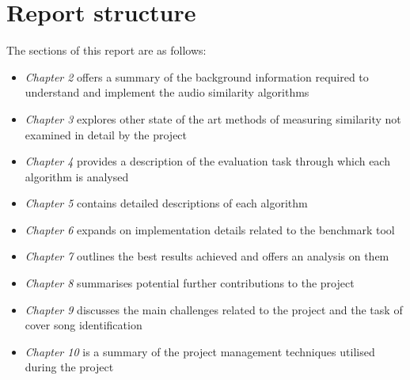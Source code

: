 \section{Report structure}
\label{structure}
The sections of this report are as follows:
\begin{itemize}
    \item \textit{Chapter 2} offers a summary of the background information required to
    understand and implement the audio similarity algorithms
    \item \textit{Chapter 3} explores other state of the art methods of measuring
    similarity not examined in detail by the project
    \item \textit{Chapter 4} provides a description of the evaluation task through which
    each algorithm is analysed
    \item \textit{Chapter 5} contains detailed descriptions of each algorithm
    \item \textit{Chapter 6} expands on implementation details related to the benchmark
    tool
    \item \textit{Chapter 7} outlines the best results achieved and offers an analysis on
    them
    \item \textit{Chapter 8} summarises potential further contributions to the project
    \item \textit{Chapter 9} discusses the main challenges related to the
    project and the task of cover song identification
    \item \textit{Chapter 10} is a summary of the project management techniques utilised during the project
\end{itemize}
